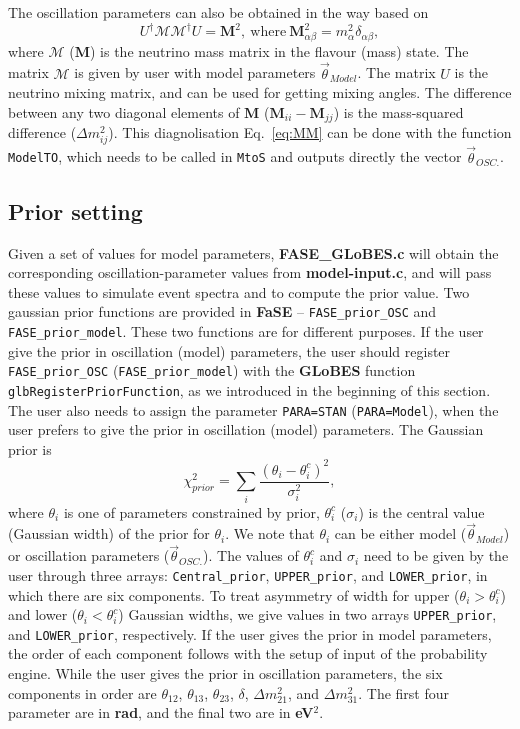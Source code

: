 \documentclass[aps,prd,nofootinbib,preprint]{revtex4}
\begin{document}
The oscillation parameters can also be obtained in the way based on
\begin{equation}\label{eq:MM}
U^\dagger\mathcal{M}\mathcal{M}^\dagger U = \mathbf{M}^2,~\text{where}~\mathbf{M}^2_{\alpha\beta}=m_\alpha^2\delta_{\alpha\beta},
\end{equation}
where $\mathcal{M}$ ($\mathbf{M}$) is the neutrino mass matrix in the flavour (mass) state. The matrix $\mathcal{M}$ is given by user with model parameters $\vec{\theta}_{Model}$. The matrix $U$ is the neutrino mixing matrix, and can be used for getting mixing angles. The difference between any two diagonal elements of $\textbf{M}$ ($\textbf{M}_{ii}-\textbf{M}_{jj}$) is the mass-squared difference ($\Delta m_{ij}^2$). This diagnolisation Eq.~\ref{eq:MM} can be done with the function \texttt{ModelTO}, which needs to be called in \texttt{MtoS} and outputs directly the vector $\vec{\theta}_{OSC.}$.

\subsection{Prior setting}\label{sec:prior}
Given a set of values for model parameters, \textbf{FASE\_GLoBES.c} will obtain the corresponding oscillation-parameter values from \textbf{model-input.c}, and will pass these values to simulate event spectra and to compute the prior value. Two gaussian prior functions are provided in \textbf{FaSE} -- \texttt{FASE\_prior\_OSC} and \texttt{FASE\_prior\_model}. These two functions are for different purposes. If the user give the prior in oscillation (model) parameters, the user should register \texttt{FASE\_prior\_OSC} (\texttt{FASE\_prior\_model}) with the \textbf{GLoBES} function \texttt{glbRegisterPriorFunction}, as we introduced in the beginning of this section. The user also needs to assign the parameter \texttt{PARA=STAN} (\texttt{PARA=Model}), when the user prefers to give the prior in oscillation (model) parameters. The Gaussian prior is 
\begin{equation}\label{eq:prior}
\chi^2_{prior}=\sum_{i} \frac{(\theta_i-\theta^c_i)^2}{\sigma_i^2},
\end{equation}
 where $\theta_i$ is one of parameters constrained by prior, $\theta^c_i$ ($\sigma_i$) is the central value (Gaussian width) of the prior for $\theta_i$. We note that $\theta_i$ can be either model ($\vec{\theta}_{Model}$) or oscillation parameters ($\vec{\theta}_{OSC.}$).
%
The values of $\theta^c_i$ and $\sigma_i$ need to be given by the user through three arrays: \texttt{Central\_prior}, \texttt{UPPER\_prior}, and \texttt{LOWER\_prior}, in which there are six components. To treat asymmetry of width for upper ($\theta_i>\theta_i^c$) and lower ($\theta_i<\theta_i^c$) Gaussian widths, we give values in two arrays \texttt{UPPER\_prior}, and \texttt{LOWER\_prior}, respectively. If the user gives the prior in model parameters, the order of each component follows with the setup of input of the probability engine. While the user gives the prior in oscillation parameters, the six components in order are $\theta_{12}$, $\theta_{13}$, $\theta_{23}$, $\delta$, $\Delta m_{21}^2$, and  $\Delta m_{31}^2$. The first four parameter are in \textbf{rad}, and the final two are in \textbf{eV$^2$}.
\end{document}
